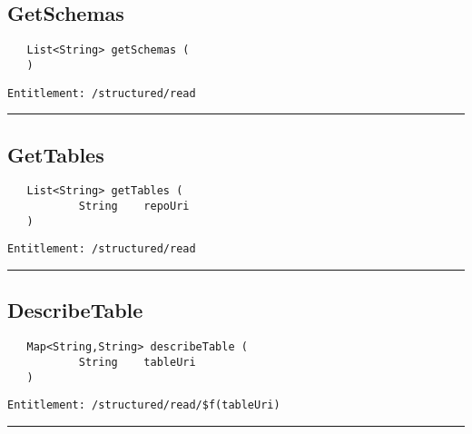 \subsection{GetSchemas}
\label{Api:GetSchemas}
\begin{Verbatim}
   List<String> getSchemas (
   )
\end{Verbatim}
\begin{Verbatim}[formatcom=\color{Maroon}]
  Entitlement: /structured/read
\end{Verbatim}



\rule{12cm}{2pt}
\subsection{GetTables}
\label{Api:GetTables}
\begin{Verbatim}
   List<String> getTables (
           String    repoUri
   )
\end{Verbatim}
\begin{Verbatim}[formatcom=\color{Maroon}]
  Entitlement: /structured/read
\end{Verbatim}



\rule{12cm}{2pt}
\subsection{DescribeTable}
\label{Api:DescribeTable}
\begin{Verbatim}
   Map<String,String> describeTable (
           String    tableUri
   )
\end{Verbatim}
\begin{Verbatim}[formatcom=\color{Maroon}]
  Entitlement: /structured/read/$f(tableUri)
\end{Verbatim}



\rule{12cm}{2pt}
